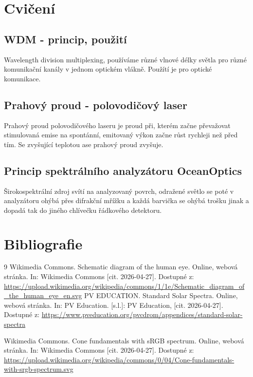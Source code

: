 \documentclass[a4paper, 12pt]{article}
\begin{document}
    \section{Cvičení}
        \subsection{WDM - princip, použití}
            Wavelength division multiplexing, používáme různé vlnové délky světla pro různé komunikační kanály
            v jednom optickém vlákně. Použítí je pro optické komunikace.
        \subsection{Prahový proud - polovodičový laser}
            Prahový proud polovodičového laseru je proud při, kterém začne 
            převažovat stimulovaná emise na spontánní, emitovaný výkon začne růst rychleji než před tím.
            Se zvyšující teplotou ase prahový proud zvyšuje.

        \subsection{Princip spektrálního analyzátoru OceanOptics}
            Širokospektrální zdroj svítí na analyzovaný povrch,
            odražené světlo se poté v analyzátoru ohýbá přes difrakční mřížku
            a každá barvička se ohýbá trošku jinak a dopadá tak do jiného chlívečku řádkového detektoru.

    \newpage
    \section{Bibliografie}
        \begin{thebibliography}{9}
            Wikimedia Commons. Schematic diagram of the human eye. Online, webová stránka. In: Wikimedia Commons [cit. 2026-04-27]. Dostupné z: \url{https://upload.wikimedia.org/wikipedia/commons/1/1e/Schematic_diagram_of_the_human_eye_en.svg}
            PV EDUCATION. Standard Solar Spectra. Online, webová stránka. In: PV Education. [s.l.]: PV Education, [cit. 2026-04-27]. Dostupné z: \url{https://www.pveducation.org/pvcdrom/appendices/standard-solar-spectra}

            Wikimedia Commons. Cone fundamentals with sRGB spectrum. Online, webová stránka. In: Wikimedia Commons [cit. 2026-04-27]. Dostupné z: \url{https://upload.wikimedia.org/wikipedia/commons/0/04/Cone-fundamentals-with-srgb-spectrum.svg}
        \end{thebibliography}
\end{document}
